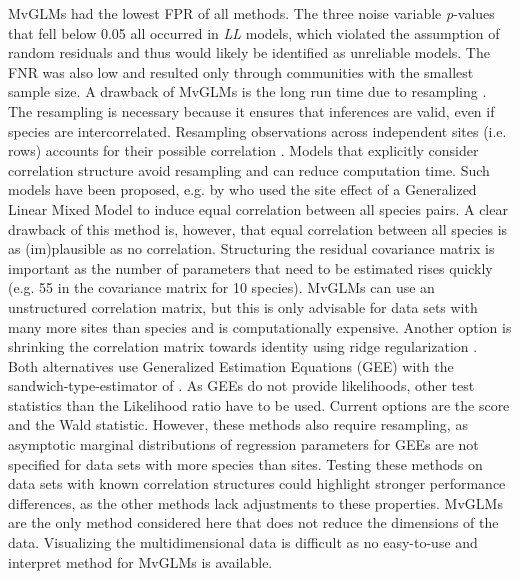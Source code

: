     MvGLMs had the lowest FPR of all methods. 
    The three noise variable \textit{p}-values that fell below 0.05 all occurred in \textit{LL} models, which violated the assumption of random residuals and thus would likely be identified as unreliable models.
	The FNR was also low and resulted only through communities with the smallest sample size.
	A drawback of MvGLMs is the long run time due to resampling \citep{Wang2012}.
	The resampling is necessary because it ensures that inferences are valid, even if species are intercorrelated. 
	Resampling observations across independent sites (i.e. rows) accounts for their possible correlation \citep{anderson2001new}. 
	Models that explicitly consider correlation structure avoid resampling and can reduce computation time.
	Such models have been proposed, e.g. by \citet{Jamil2012} who used the site effect of a Generalized Linear Mixed Model to induce equal correlation between all species pairs.
    A clear drawback of this method is, however, that equal correlation between all species is as (im)plausible as no correlation. 
    Structuring the residual covariance matrix is important as the number of parameters that need to be estimated rises quickly (e.g. 55 in the covariance matrix for 10 species).
    MvGLMs can use an unstructured correlation matrix, but this is only advisable for data sets with many more sites than species and is computationally expensive. 
    Another option is shrinking the correlation matrix towards identity using ridge regularization \citep{warton2008penalized, Warton2011a}.
	Both alternatives use Generalized Estimation Equations (GEE) with the sandwich-type-estimator of \citet{Warton2011a}.
	As GEEs do not provide likelihoods, other test statistics than the Likelihood ratio have to be used. 
	Current options are the score and the Wald statistic.
	However, these methods also require resampling, as asymptotic marginal distributions of regression parameters for GEEs are not specified for data sets with more species than sites.
    Testing these methods on data sets with known correlation structures could highlight stronger performance differences, as the other methods lack adjustments to these properties.
	MvGLMs are the only method considered here that does not reduce the dimensions of the data.
	Visualizing the multidimensional data is difficult as no easy-to-use and interpret method for MvGLMs is available. \\

